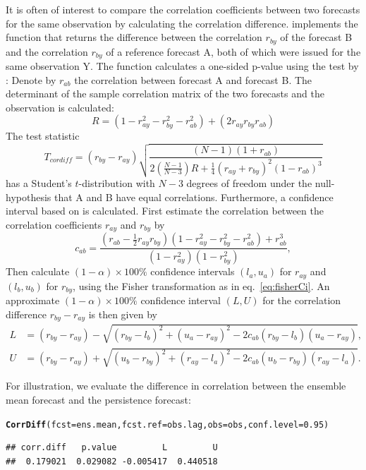 \documentclass[article]{jss}\usepackage{graphicx, color}
\makeatletter
\newcommand{\hlfunctioncall}[1]{\textcolor[rgb]{0,0.501960784313725,0.752941176470588}{\textbf{#1}}}%
\newenvironment{kframe}{%
 \def\at@end@of@kframe{}%
 \ifinner\ifhmode%
  \def\at@end@of@kframe{\end{minipage}}%
  \begin{minipage}{\columnwidth}%
 \fi\fi%
 \def\FrameCommand##1{\hskip\@totalleftmargin \hskip-\fboxsep
 \colorbox{shadecolor}{##1}\hskip-\fboxsep
     \hskip-\linewidth \hskip-\@totalleftmargin \hskip\columnwidth}%
 \MakeFramed {\advance\hsize-\width
   \@totalleftmargin\z@ \linewidth\hsize
   \@setminipage}}%
 {\par\unskip\endMakeFramed%
 \at@end@of@kframe}
\newenvironment{knitrout}{}{} %
\makeatother
\begin{document}
It is often of interest to compare the correlation coefficients between two forecasts for the same observation by calculating the correlation difference.
 implements the function  that returns the difference between the correlation $r_{by}$ of the forecast B and the correlation $r_{by}$ of a reference forecast A, both of which were issued for the same observation Y.
The function calculates a one-sided p-value using the test by \citet{steiger1980tests}:
Denote by $r_{ab}$ the correlation between forecast A and forecast B.
The determinant of the sample correlation matrix of the two forecasts and the observation is calculated:
%
\begin{equation}
R  = (1 - r_{ay}^2 - r_{by}^2 - r_{ab}^2) + (2 r_{ay} r_{by} r_{ab})
\end{equation}
%
The test statistic
%
\begin{equation}
T_{cordiff}  = (r_{by} - r_{ay}) \sqrt{\frac{(N-1)(1+r_{ab})}{2\left(\frac{N-1}{N-3}\right) R+\frac{1}{4}(r_{ay}+r_{by})^2 (1-r_{ab})^3}}\label{eq:T2}
\end{equation}
%
has a Student's $t$-distribution with $N-3$ degrees of freedom under the null-hypothesis that A and B have equal correlations.
Furthermore, a confidence interval based on \citet{zou2007toward} is calculated.
First estimate the correlation between the correlation coefficients $r_{ay}$ and $r_{by}$ by
%
\begin{equation}
c_{ab} = \frac{\left(r_{ab} - \frac{1}{2}  r_{ay}  r_{by}\right)  \left(1 - r_{ay}^2 - r_{by}^2 - r_{ab}^2\right) + r_{ab}^3}{(1-r_{ay}^2)(1-r_{by}^2)},
\end{equation}
%
Then calculate $(1-\alpha)\times 100\%$ confidence intervals $(l_a, u_a)$ for $r_{ay}$ and $(l_b, u_b)$ for $r_{by}$, using the Fisher transformation as in eq.~\ref{eq:fisherCi}.
An approximate $(1-\alpha)\times 100\%$ confidence interval $(L,U)$ for the correlation difference $r_{by} - r_{ay}$ is then given by
%
\begin{align}
L & = (r_{by} - r_{ay}) - \sqrt{(r_{by} - l_b)^2 + (u_a-r_{ay})^2 - 2  c_{ab}  (r_{by} - l_b) 
(u_a - r_{ay})},\nonumber\\
U & =  (r_{by} - r_{ay}) + \sqrt{(u_{b} - r_{by})^2 + (r_{ay}-l_a)^2 - 2 c_{ab} (u_b-r_{by})(r_{ay}-l_a)}.\label{eq:zou}
\end{align}

For illustration, we evaluate the difference in correlation between the ensemble mean forecast and the persistence forecast:
%
\begin{knitrout}
\color{fgcolor}\begin{kframe}
\begin{alltt}
\hlfunctioncall{CorrDiff}(fcst=ens.mean, fcst.ref=obs.lag, obs=obs, conf.level=0.95)
\end{alltt}
\begin{verbatim}
## corr.diff   p.value         L         U 
##  0.179021  0.029082 -0.005417  0.440518
\end{verbatim}
\end{kframe}
\end{knitrout}
\end{document}
